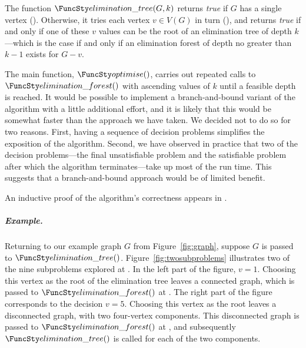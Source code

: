 {    The function $\TDConnected(G, k)$ returns \emph{true} if $G$ has a single vertex
    ().  Otherwise,
    it tries each vertex $v \in V(G)$ in turn (), and returns \emph{true} if
    and only if one of these $v$ values can be the root of an elimination tree of depth
    $k$---which is the case if and only if 
    an elimination forest of depth no greater than $k-1$ exists for $G-v$.

    The main function, $\TDOptimise()$, carries  
    out repeated calls to $\TDGeneral()$ with ascending values of $k$
    until a feasible depth is reached.  It would be possible to implement a
    branch-and-bound variant of the algorithm with a little additional effort, and it is likely that
    this would be somewhat faster than the approach we have taken.  We decided not to do so for two
    reasons.  First, having a sequence of decision problems simplifies the exposition of the algorithm.
    Second, we have observed in practice that two of the decision problems---the final unsatisfiable problem
    and the satisfiable problem after which the algorithm terminates---take up most of the run time.
    This suggests that a branch-and-bound approach would be of limited benefit.

    An inductive proof of the algorithm's correctness appears in .

    \subparagraph*{Example.}
    Returning to our example graph $G$ from Figure~\ref{fig:graph}, suppose $G$ is 
    passed to $\TDConnected()$.  Figure~\ref{fig:twosubproblems} illustrates two of the nine subproblems explored at
    .  In the left part of the figure, $v=1$.  Choosing this vertex
    as the root of the elimination tree leaves a connected graph, which is
    passed to $\TDGeneral()$ at .  The right part of the figure
    corresponds to the decision $v=5$.  Choosing
    this vertex as the root leaves a disconnected graph, with two four-vertex components.  This disconnected
    graph is passed to $\TDGeneral()$ at , and subsequently $\TDConnected()$ is
    called for each of the two components.

}
